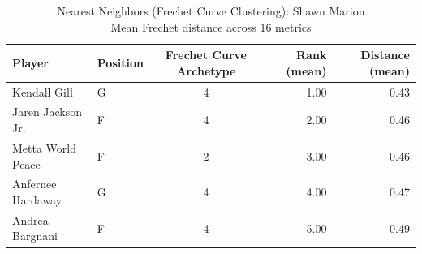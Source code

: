 \begin{table}[t]
\caption*{
{\fontsize{20}{25} Nearest Neighbors (Frechet Curve Clustering): Shawn Marion\fontsize{12}{15}\selectfont } \\ 
{\fontsize{14}{17}\selectfont  Mean Frechet distance across 16 metrics\fontsize{12}{15}\selectfont }
} 
\fontsize{12.0pt}{14.0pt}\selectfont
\begin{tabular*}{\linewidth}{@{\extracolsep{\fill}}llcrr}
\toprule
Player & Position & Frechet Curve Archetype & Rank (mean) & Distance (mean) \\ 
\midrule\addlinespace[2.5pt]
Kendall Gill & G & 4 & 1.00 & 0.43 \\ 
Jaren Jackson Jr. & F & 4 & 2.00 & 0.46 \\ 
Metta World Peace & F & 2 & 3.00 & 0.46 \\ 
Anfernee Hardaway & G & 4 & 4.00 & 0.47 \\ 
Andrea Bargnani & F & 4 & 5.00 & 0.49 \\ 
\bottomrule
\end{tabular*}
\end{table}

